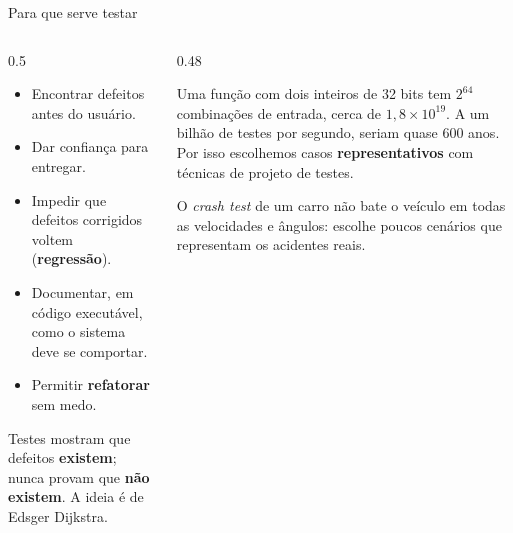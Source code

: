 \begin{frame}{Para que serve testar}
  \begin{columns}[T]
    \begin{column}{0.5\textwidth}
      \begin{conceito}
        \begin{itemize}
          \item Encontrar defeitos antes do usuário.
          \item Dar confiança para entregar.
          \item Impedir que defeitos corrigidos voltem (\textbf{regressão}).
          \item Documentar, em código executável, como o sistema deve se comportar.
          \item Permitir \textbf{refatorar} sem medo.
        \end{itemize}
      \end{conceito}
      \begin{atencao}
        Testes mostram que defeitos \textbf{existem}; nunca provam que \textbf{não existem}. A ideia é de Edsger Dijkstra.
      \end{atencao}
    \end{column}
    \begin{column}{0.48\textwidth}
      \begin{pordentro}
        Uma função com dois inteiros de 32 bits tem $2^{64}$ combinações de entrada, cerca de $1{,}8\times10^{19}$. A um bilhão de testes por segundo, seriam quase 600 anos. Por isso escolhemos casos \textbf{representativos} com técnicas de projeto de testes.
      \end{pordentro}
      \begin{analogia}
        O \emph{crash test} de um carro não bate o veículo em todas as velocidades e ângulos: escolhe poucos cenários que representam os acidentes reais.
      \end{analogia}
    \end{column}
  \end{columns}
\end{frame}

